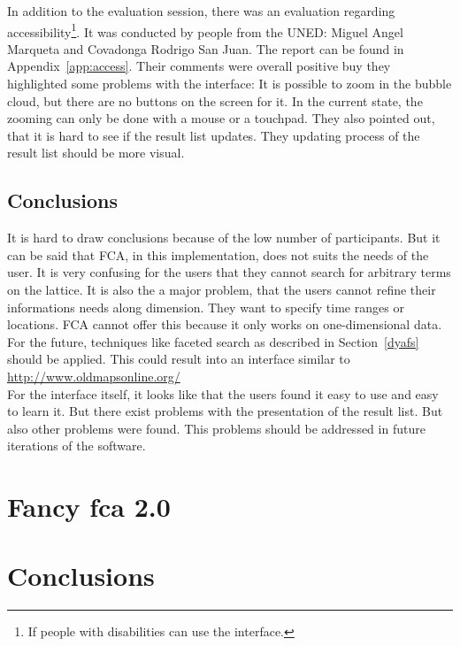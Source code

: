 \documentclass[11pt]{report}
\begin{document}
In addition to the evaluation session, there was an evaluation regarding accessibility\footnote{If people with disabilities can use the interface.}. It was conducted by people from the UNED: Miguel Angel Marqueta and Covadonga Rodrigo San Juan. The report can be found in Appendix~\ref{app:access}. Their comments were overall positive buy they highlighted some problems with the interface: It is possible to zoom in the bubble cloud, but there are no buttons on the screen for it. In the current state, the zooming can only be done with a mouse or a touchpad. They also pointed out, that it is hard to see if the result list updates. They updating process of the result list should be more visual.

\section{Conclusions} 
It is hard to draw conclusions because of the low number of participants. But it can be said that FCA, in this implementation, does not suits the needs of the user. It is very confusing for the users that they cannot search for arbitrary terms on the lattice. It is also the a major problem, that the users cannot refine their informations needs along dimension. They want to specify time ranges or locations. FCA cannot offer this because it only works on one-dimensional data. For the future, techniques like faceted search as described in Section~\ref{dyafs} should be applied. This could result into an interface similar to \url{http://www.oldmapsonline.org/}\\
 
For the interface itself, it looks like that the users found it easy to use and easy to learn it. But there exist problems with the presentation of the result list. But also other problems were found. This problems should be addressed in future iterations of the software.
\chapter{Fancy \acrshort{fca} 2.0}
\label{Fancy 2.0}

\blindtext

\chapter{Conclusions}
\label{Conclusions}
\end{document}
